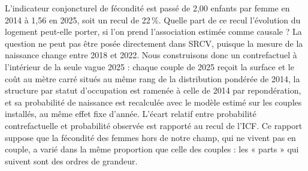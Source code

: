 \documentclass[11pt,a4paper]{article}
\theoremstyle{plain}
\theoremstyle{definition}
\theoremstyle{remark}
\begin{document}
L'indicateur conjoncturel de fécondité est passé de 2,00 enfants par femme en 2014 à 1,56 en 2025, soit un recul de 22\,\%. Quelle part de ce recul l'évolution du logement peut-elle porter, si l'on prend l'association estimée comme causale ? La question ne peut pas être posée directement dans SRCV, puisque la mesure de la naissance change entre 2018 et 2022. Nous construisons donc un contrefactuel à l'intérieur de la seule vague 2025 : chaque couple de 2025 reçoit la surface et le coût au mètre carré situés au même rang de la distribution pondérée de 2014, la structure par statut d'occupation est ramenée à celle de 2014 par repondération, et sa probabilité de naissance est recalculée avec le modèle estimé sur les couples installés, au même effet fixe d'année. L'écart relatif entre probabilité contrefactuelle et probabilité observée est rapporté au recul de l'ICF. Ce rapport suppose que la fécondité des femmes hors de notre champ, qui ne vivent pas en couple, a varié dans la même proportion que celle des couples : les « parts » qui suivent sont des ordres de grandeur.
\end{document}
